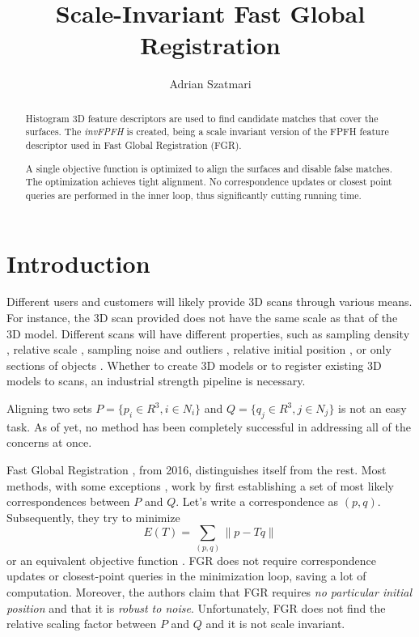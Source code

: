 \documentclass[10pt,a4paper]{article}
\author{{\Large	 Adrian Szatmari}}
\title{{\huge Scale-Invariant Fast Global Registration}}
\begin{document}
\maketitle
\begin{abstract}\normalsize
Histogram 3D feature descriptors are used to find candidate matches that cover the surfaces. The \textit{invFPFH} is created, being a scale invariant version of the FPFH feature descriptor used in Fast Global Registration (FGR). 

A single objective function is optimized to align the surfaces and disable false matches. The optimization achieves tight alignment. No correspondence updates or closest point queries are performed in the inner loop, thus significantly cutting running time.
\end{abstract}

\tableofcontents

\newpage 
{}
\setcounter{page}{1}
\section{Introduction}

Different users and customers will likely provide 3D scans through various means. For instance, the 3D scan provided does not have the same scale as that of the 3D model. Different scans will have different properties, such as sampling density \cite{gelfand2005robust,granger2002multi,meer1991robust}, relative scale \cite{lin2013scale}, sampling noise and outliers \cite{zhou2016fast,chetverikov2005robust}, relative initial position \cite{zhou2016fast}, or only sections of objects \cite{mellado2014super}. Whether to create 3D models or to register existing 3D models to scans, an industrial strength pipeline is necessary. 

Aligning two sets $P = \{p_i \in R^3, i \in N_i\}$ and $Q = \{q_j \in R^3, j \in N_j\}$ is not an easy task. As of yet, no method has been completely successful in addressing all of the concerns at once. 

Fast Global Registration \cite{zhou2016fast}, from 2016, distinguishes itself from the rest. Most methods, with some exceptions \cite{chen2017fast,sehgal2010real,hoppe1992surface,li2017improved}, work by first establishing a set of most likely correspondences between $P$ and $Q$. Let's write a correspondence as $(p,q)$. Subsequently, they try to minimize
\[E(T) = \sum_{(p,q)} \|p - Tq\|\]
or an equivalent objective function \cite{chen1992object,eggert1997estimating}. FGR does not require correspondence updates or closest-point queries in the minimization loop, saving a lot of computation. Moreover, the authors claim that FGR requires \textit{no particular initial position} and that it is \textit{robust to noise}. Unfortunately, FGR does not find the relative scaling factor between $P$ and $Q$ and it is not scale invariant. 
\end{document}
